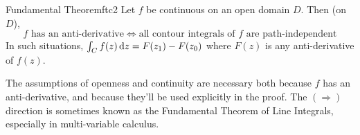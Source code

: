 \begin{thm}{Fundamental Theorem}{ftc2}
Let $f$ be continuous on an open domain $D$. Then (on $D$),
\[\text{$f$ has an anti-derivative} \iff \text{all contour integrals of $f$ are path-independent}\]
In such situations, $\int_Cf(z)\,{\mathrm{d} z}=F(z_1)-F(z_0)$ where $F(z)$ is any anti-derivative of $f(z)$.
\end{thm}

The assumptions of openness and continuity are necessary both because $f$ has an anti-derivative, and because they'll be used explicitly in the proof. The $(\Rightarrow)$ direction is sometimes known as the Fundamental Theorem of Line Integrals, especially in multi-variable calculus.

% 
% 
% 

% 


